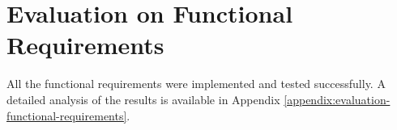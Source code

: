 \section{Evaluation on Functional Requirements}

All the functional requirements were implemented and tested successfully. A detailed analysis of the results is available in Appendix \ref{appendix:evaluation-functional-requirements}.
